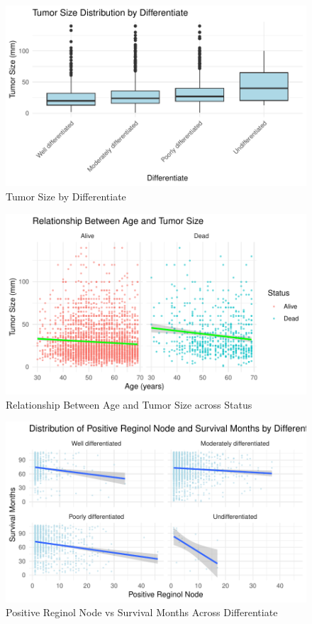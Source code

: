 \documentclass[
]{article}
\begin{document}
\begin{figure}
\includegraphics[width=0.9\linewidth]{P8130_project_report_files/figure-latex/tumor_size_by_differentiate-1} \caption{Tumor Size by Differentiate}\label{fig:tumor_size_by_differentiate}
\end{figure}

\begin{figure}
\includegraphics[width=0.9\linewidth]{P8130_project_report_files/figure-latex/relationship_between_age_and_tumor_size_across_status-1} \caption{Relationship Between Age and Tumor Size across Status}\label{fig:relationship_between_age_and_tumor_size_across_status}
\end{figure}

\begin{figure}
\includegraphics[width=0.9\linewidth]{P8130_project_report_files/figure-latex/positive_reginol_node_vs_survival_months_across_differentiate-1} \caption{Positive Reginol Node vs Survival Months Across Differentiate}\label{fig:positive_reginol_node_vs_survival_months_across_differentiate}
\end{figure}
\end{document}
